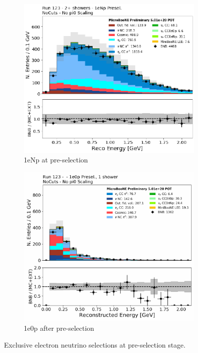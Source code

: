 \begin{figure}[H] 
\begin{center}
    \begin{subfigure}[b]{0.45\textwidth}
    \centering
    \includegraphics[width=1.00\textwidth]{Fakedata/set1/np_2shr.pdf}
    \caption{\label{fig:fakedata:set1:Np_presel_recoe} 1eNp at pre-selection}
    \end{subfigure}
    \begin{subfigure}[b]{0.45\textwidth}
    \centering
    \includegraphics[width=1.00\textwidth]{Fakedata/set1/zp_presel_recoe.pdf}
    \caption{\label{fig:fakedata:set1:2shr0p} 1e0p after pre-selection}
    \end{subfigure}
\caption{\label{fig:fakedata:set1:presel} Exclusive electron neutrino selections at pre-selection stage.}
\end{center}
\end{figure}


